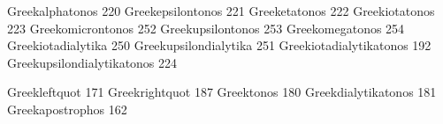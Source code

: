  Greekalphatonos             220   
 Greekepsilontonos           221   
 Greeketatonos               222   
 Greekiotatonos              223   
 Greekomicrontonos           252   
 Greekupsilontonos           253    
 Greekomegatonos             254
 Greekiotadialytika          250
 Greekupsilondialytika       251
 Greekiotadialytikatonos     192
 Greekupsilondialytikatonos  224

%
%

 Greekleftquot               171
 Greekrightquot              187
 Greektonos                  180
 Greekdialytikatonos         181
 Greekapostrophos            162

\stopencoding 
